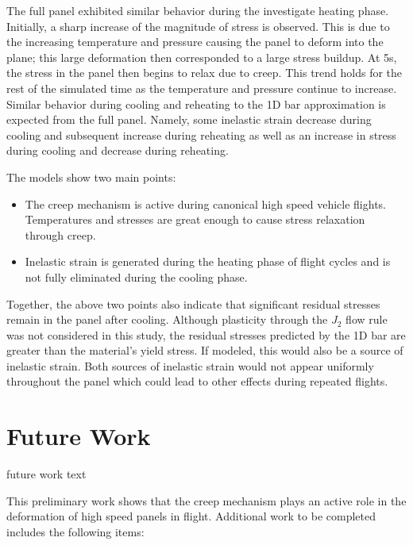 \documentclass[conf]{new-aiaa}
\begin{document}
The full panel exhibited similar behavior during the investigate heating phase.
Initially, a sharp increase of the magnitude of stress is observed.
This is due to the increasing temperature and pressure causing the panel
to deform into the plane; 
this large deformation then corresponded to a large stress buildup.
At 5s, the stress in the panel then begins to relax due to creep.
This trend holds for the rest of the simulated time as the temperature and 
pressure continue to increase. 
Similar behavior during cooling and reheating to the 1D bar approximation 
is expected from the full panel. 
Namely, some inelastic strain decrease during cooling and subsequent 
increase during reheating as well as an increase in stress during cooling
and decrease during reheating.

The models show two main points:
\begin{itemize}
  \item The creep mechanism is active during canonical high speed 
    vehicle flights. Temperatures and stresses are great enough to 
    cause stress relaxation through creep.
  \item Inelastic strain is generated during the heating phase
    of flight cycles and is not fully eliminated during the cooling phase.
\end{itemize}
Together, the above two points also indicate that significant residual 
stresses remain in the panel after cooling. 
Although plasticity through the $J_2$ flow rule was not considered 
in this study, the residual stresses predicted by the 1D bar 
are greater than the material's yield stress. 
If modeled, this would also be a source of inelastic strain.
Both sources of inelastic strain would not appear uniformly
throughout the panel which could lead to other effects 
during repeated flights.

\section{Future Work} \label{sec_future}
future work text

This preliminary work shows that the creep mechanism plays 
an active role in the deformation of high speed panels in flight.
Additional work to be completed includes the following items:
\end{document}
